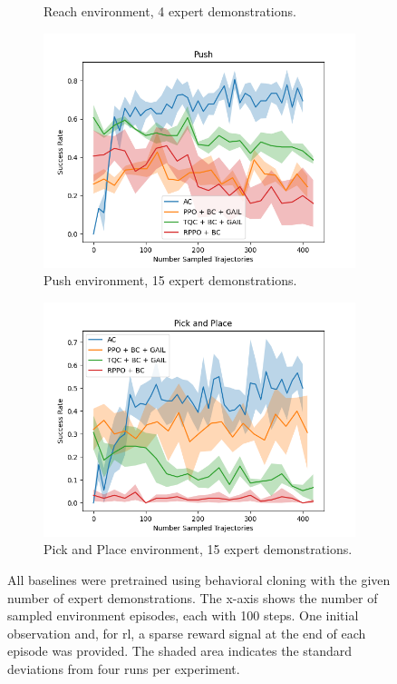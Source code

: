 \begin{figure}[htbp]
\begin{subfigure}[t]{0.45\textwidth}
    \caption{Reach environment, 4 expert demonstrations.}
    \label{fig:plot1}
  \end{subfigure}
  \medskip
  \begin{subfigure}[t]{0.45\textwidth}
    \includegraphics[width=\textwidth]{images/FineTuning/Push.png}
    \caption{Push environment, 15 expert demonstrations.}
    \label{fig:plot2}
  \end{subfigure}
  \begin{subfigure}[t]{0.45\textwidth}
    \includegraphics[width=\textwidth]{images/FineTuning/Pick and Place.png}
    \caption{Pick and Place environment, 15 expert demonstrations.}
    \label{fig:plot4}
  \end{subfigure}
  \caption{
    All baselines were pretrained using behavioral cloning with the given number of expert demonstrations. 
    The x-axis shows the number of sampled environment episodes, each with 100 steps. 
    One initial observation and, for \ac{rl}, a sparse reward signal at the end of each episode was provided. 
    The shaded area indicates the standard deviations from four runs per experiment.}
    \label{fig:finetuning}
\end{figure}


